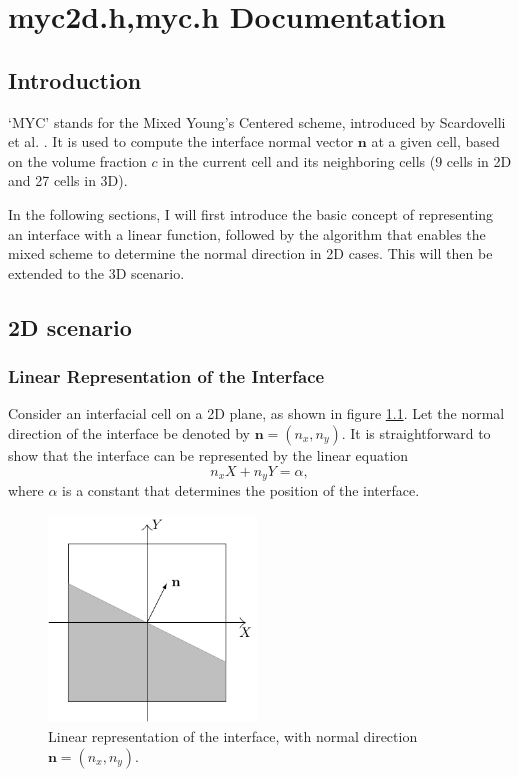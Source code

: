 \chapter{myc2d.h,myc.h Documentation}
\ifsingle
\maketitle
\fi
\chaptermeta[draft][2025-07-15]

\section{Introduction}
‘MYC’ stands for the Mixed Young’s Centered scheme, introduced by Scardovelli et al. \cite{2003_Scardovelli}. It is used to compute the interface normal vector $\mathbf{n}$ at a given cell, based on the volume fraction $c$ in the current cell and its neighboring cells (9 cells in 2D and 27 cells in 3D).

In the following sections, I will first introduce the basic concept of representing an interface with a linear function, followed by the algorithm that enables the mixed scheme to determine the normal direction in 2D cases. This will then be extended to the 3D scenario.

\section{2D scenario}
\subsection{Linear Representation of the Interface}

Consider an interfacial cell on a 2D plane, as shown in figure \ref{fig:myc-2Dlinear}. Let the normal direction of the interface be denoted by $\mathbf{n} = (n_x, n_y)$. It is straightforward to show that the interface can be represented by the linear equation
\begin{equation}\label{equ:myc-original}
  n_x X + n_y Y = \alpha,
\end{equation}
where $\alpha$ is a constant that determines the position of the interface.

\begin{figure}[H]
    \centering
    \includegraphics[height=5.5cm]{./image/myc-h-and-myc2d-h/2Dlinear-face.pdf}
    \caption{Linear representation of the interface, with normal direction $\mathbf{n} = (n_x, n_y)$.}
    \label{fig:myc-2Dlinear}
\end{figure}

